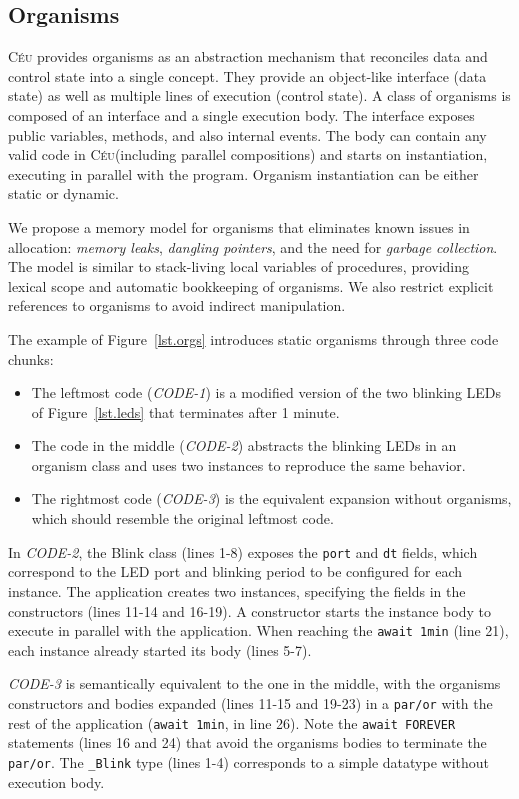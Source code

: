 \documentclass{acm_proc_article-sp}
\newcommand{\CEU}{\textsc{C\'{e}u}\xspace}
\newcommand{\code}[1] {{\small{\texttt{#1}}}}
\newcommand{\1}{\;}
\newcommand{\2}{\;\;}
\newcommand{\3}{\;\;\;}
\newcommand{\5}{\;\;\;\;\;}
\begin{document}
\subsection{Organisms}

\CEU provides organisms as an abstraction mechanism that reconciles data and 
control state into a single concept.
They provide an object-like interface (data state) as well as multiple lines of 
execution (control state).
%
A class of organisms is composed of an interface and a single execution body.  
The interface exposes public variables, methods, and also internal events.
The body can contain any valid code in \CEU (including parallel compositions) 
and starts on instantiation, executing in parallel with the program.
Organism instantiation can be either static or dynamic.

We propose a memory model for organisms that eliminates known issues in 
allocation: \emph{memory leaks}, \emph{dangling pointers}, and the need for 
\emph{garbage collection}.
%
The model is similar to stack-living local variables of procedures, providing 
lexical scope and automatic bookkeeping of organisms.
We also restrict explicit references to organisms to avoid indirect 
manipulation.

The example of Figure~\ref{lst.orgs} introduces static organisms through three 
code chunks:
%
\begin{itemize}
\item The leftmost code (\emph{CODE-1}) is a modified version of the two 
blinking LEDs of Figure~\ref{lst.leds} that terminates after 1 minute.
%
\item The code in the middle (\emph{CODE-2}) abstracts the blinking LEDs in an 
organism class and uses two instances to reproduce the same behavior.
%
\item The rightmost code (\emph{CODE-3}) is the equivalent expansion without 
organisms, which should resemble the original leftmost code.
\end{itemize}
%
In \emph{CODE-2}, the Blink class (lines 1-8) exposes the \code{port} and 
\code{dt} fields, which correspond to the LED port and blinking period to be 
configured for each instance.
The application creates two instances, specifying the fields in the 
constructors (lines 11-14 and 16-19).
A constructor starts the instance body to execute in parallel with the 
application.
When reaching the \code{await 1min} (line 21), each instance already started 
its body (lines 5-7).

\emph{CODE-3} is semantically equivalent to the one in the middle, with the 
organisms constructors and bodies expanded (lines 11-15 and 19-23) in a 
\code{par/or} with the rest of the application (\code{await 1min}, in line 26).  
Note the \code{await FOREVER} statements (lines 16 and 24) that avoid the 
organisms bodies to terminate the \code{par/or}.
The \code{\_Blink} type (lines 1-4) corresponds to a simple datatype without 
execution body.
\end{document}
